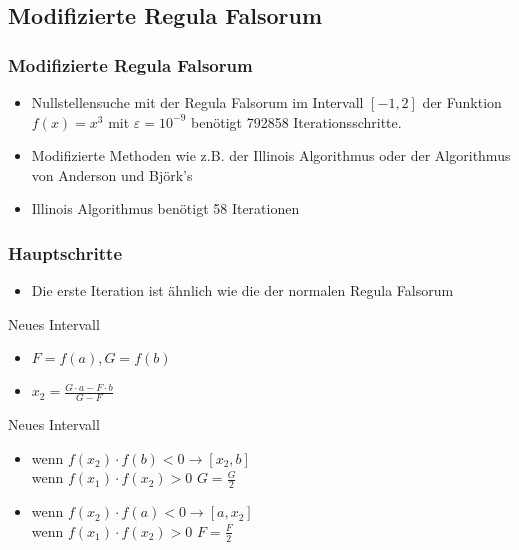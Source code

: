 \documentclass[table]{beamer}
\begin{document}
\subsection{Modifizierte Regula Falsorum}
\begin{frame}
\frametitle{Modifizierte Regula Falsorum}
\begin{itemize}
\item Nullstellensuche mit der Regula Falsorum im Intervall $[-1,2]$ der Funktion $f(x)=x^3$ mit $\varepsilon= 10^{-9}$  benötigt 792858 Iterationsschritte.
\item  Modifizierte Methoden wie z.B. der Illinois Algorithmus oder der Algorithmus von Anderson und Björk's
\item Illinois Algorithmus benötigt 58 Iterationen
\end {itemize}
\end{frame}	
\begin{frame}
\frametitle{Hauptschritte}
\begin{itemize}
\item Die erste Iteration ist ähnlich wie die der normalen Regula Falsorum

\end {itemize}

\begin{block}{Neues Intervall}
\begin{itemize}
\item $F=f(a), G=f(b)$
\item  $x_2 = \frac{G\cdot a - F\cdot b}{G - F}$
\end{itemize}
\end{block}
\begin{block}{Neues Intervall}
\begin{itemize}
\item wenn $f(x_2)\cdot f(b)<0 \to [x_2,b]$\\
wenn $ f(x_1) \cdot f(x_2) >0$  $ G=\frac{G}{2}$
\item wenn $f(x_2)\cdot f(a)< 0\to [a,x_2]$\\
wenn $f(x_1) \cdot f(x_2) >0$  $ F=\frac{F}{2}$
\end{itemize}
\end{block}
\end{frame}	
\end{document}
